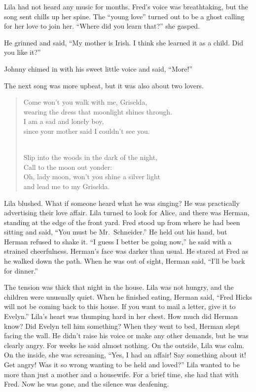 \documentclass[
  letterpaper,
]{book}
\begin{document}
Lila had not heard any music for months. Fred's voice was breathtaking,
but the song sent chills up her spine. The ``young love'' turned out to
be a ghost calling for her love to join her. ``Where did you learn
that?'' she gasped.

He grinned and said, ``My mother is Irish. I think she learned it as a
child. Did you like it?''

Johnny chimed in with his sweet little voice and said, ``More!''

The next song was more upbeat, but it was also about two lovers.

\begin{quote}
Come won't you walk with me, Griselda,\\
wearing the dress that moonlight shines through.\\
I am a sad and lonely boy,\\
since your mother said I couldn't see you.\\
\strut \\
Slip into the woods in the dark of the night,\\
Call to the moon out yonder:\\
Oh, lady moon, won't you shine a silver light\\
and lead me to my Griselda.
\end{quote}

Lila blushed. What if someone heard what he was singing? He was
practically advertising their love affair. Lila turned to look for
Alice, and there was Herman, standing at the edge of the front yard.
Fred stood up from where he had been sitting and said, ``You must be
Mr.~Schneider.'' He held out his hand, but Herman refused to shake it.
``I guess I better be going now,'' he said with a strained cheerfulness.
Herman's face was darker than usual. He stared at Fred as he walked down
the path. When he was out of sight, Herman said, ``I'll be back for
dinner.''

The tension was thick that night in the house. Lila was not hungry, and
the children were unusually quiet. When he finished eating, Herman said,
``Fred Hicks will not be coming back to this house. If you want to mail
a letter, give it to Evelyn.'' Lila's heart was thumping hard in her
chest. How much did Herman know? Did Evelyn tell him something? When
they went to bed, Herman slept facing the wall. He didn't raise his
voice or make any other demands, but he was clearly angry. For weeks he
said almost nothing. On the outside, Lila was calm. On the inside, she
was screaming, ``Yes, I had an affair! Say something about it! Get
angry! Was it so wrong wanting to be held and loved?'' Lila wanted to be
more than just a mother and a housewife. For a brief time, she had that
with Fred. Now he was gone, and the silence was deafening.
\end{document}
